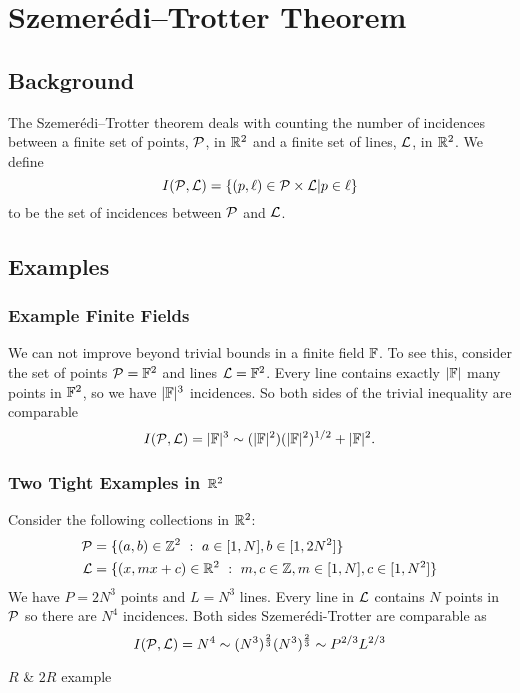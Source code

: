\chapter{Szemerédi–Trotter Theorem}

\section{Background}
The Szemerédi–Trotter theorem deals with counting the number of incidences between a finite set of points, $\mathcal P$, in
$\mathbb R^2$ and a finite set of lines, $\mathcal L$, in $\mathbb R^2$. We define 
\[I(\mathcal P,\mathcal L) = \{(p, \ell) \in \mathcal P \times \mathcal L | p \in \ell\}\] 
to be the set of incidences between $\mathcal P$ and $\mathcal L$. 

\section{Examples}
\subsection{Example Finite Fields}
\begin{example}
    

We can not improve beyond trivial bounds in a finite field $\mathbb F$. To see this, consider the set of points $\mathcal P=\mathbb F^2$ and lines 
$\mathcal L = \mathbb F^2$. Every line contains exactly $|\mathbb F|$ many points in $\mathbb F^2$, so we have $|\mathbb F|^3$ incidences. So both sides of the trivial inequality are comparable
$$
I(\mathcal P,\mathcal L) = |\mathbb F|^3 \sim (|\mathbb F|^2)(|\mathbb F|^2)^{1/2} + |\mathbb F|^2.
$$
\end{example}

\subsection{Two Tight Examples in $\mathbb R^2$}
\begin{example} Consider the following collections in $\mathbb R^2$:
    \begin{align*}
    \mathcal P &= \{ (a,b) \in \mathbb Z^2 \ : \ a\in [1,N], b \in [1,2N^2] \} \\
    \mathcal L &= \{ (x,mx+c) \in \mathbb R^2 \ : \ m,c\in \mathbb Z, m\in [1,N], c \in [1,N^2] \} \end{align*}
    We have $P= 2N^3$ points and $L = N^3$ lines. Every line in $\mathcal L$ contains $N$ points in $\mathcal P$ so there are
    $N^4$ incidences. Both sides Szemerédi-Trotter are comparable as 
    $$ I(\mathcal P,\mathcal L) = N^4 \sim (N^3)^{\frac{2}{3}} (N^3)^{\frac{2}{3}} \sim P^{2/3} L^{2/3}$$
\end{example}
\begin{example}
    $R$ \& $2R$ example
\end{example}
